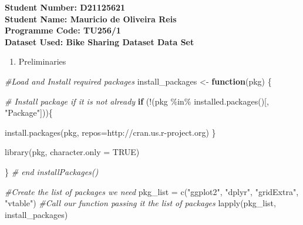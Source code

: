 \documentclass[
]{article}
\author{}
\date{\vspace{-2.5em}}
\newenvironment{Shaded}{\begin{snugshade}}{\end{snugshade}}
\newcommand{\AttributeTok}[1]{\textcolor[rgb]{0.77,0.63,0.00}{#1}}
\newcommand{\CommentTok}[1]{\textcolor[rgb]{0.56,0.35,0.01}{\textit{#1}}}
\newcommand{\ConstantTok}[1]{\textcolor[rgb]{0.00,0.00,0.00}{#1}}
\newcommand{\ControlFlowTok}[1]{\textcolor[rgb]{0.13,0.29,0.53}{\textbf{#1}}}
\newcommand{\FunctionTok}[1]{\textcolor[rgb]{0.00,0.00,0.00}{#1}}
\newcommand{\NormalTok}[1]{#1}
\newcommand{\OtherTok}[1]{\textcolor[rgb]{0.56,0.35,0.01}{#1}}
\newcommand{\SpecialCharTok}[1]{\textcolor[rgb]{0.00,0.00,0.00}{#1}}
\newcommand{\StringTok}[1]{\textcolor[rgb]{0.31,0.60,0.02}{#1}}
\providecommand{\tightlist}{%
  \setlength{\itemsep}{0pt}\setlength{\parskip}{0pt}}
\begin{document}
\textbf{Student Number: D21125621}\\
\textbf{Student Name: Mauricio de Oliveira Reis}\\
\textbf{Programme Code: TU256/1}\\
\textbf{Dataset Used: Bike Sharing Dataset Data Set}

\begin{enumerate}
\def\labelenumi{\arabic{enumi}.}
\setcounter{enumi}{-1}
\tightlist
\item
  Preliminaries
\end{enumerate}

\begin{Shaded}
\end{Shaded}

\begin{Shaded}
\begin{Highlighting}[]
\CommentTok{\#Load and Install required packages }
\NormalTok{install\_packages }\OtherTok{\textless{}{-}} \ControlFlowTok{function}\NormalTok{(pkg) \{ }
  
  \CommentTok{\# Install package if it is not already}
  \ControlFlowTok{if}\NormalTok{ (}\SpecialCharTok{!}\NormalTok{(pkg }\SpecialCharTok{\%in\%} \FunctionTok{installed.packages}\NormalTok{()[, }\StringTok{"Package"}\NormalTok{]))\{ }
    
    \FunctionTok{install.packages}\NormalTok{(pkg, }\AttributeTok{repos=}\StringTok{\textquotesingle{}http://cran.us.r{-}project.org\textquotesingle{}}\NormalTok{)}
\NormalTok{  \}}
  
  \FunctionTok{library}\NormalTok{(pkg, }\AttributeTok{character.only =} \ConstantTok{TRUE}\NormalTok{)}
  
\NormalTok{\} }\CommentTok{\# end installPackages()}

\CommentTok{\#Create the list of packages we need}
\NormalTok{pkg\_list }\OtherTok{=} \FunctionTok{c}\NormalTok{(}\StringTok{"ggplot2"}\NormalTok{, }\StringTok{"dplyr"}\NormalTok{, }\StringTok{"gridExtra"}\NormalTok{, }\StringTok{"vtable"}\NormalTok{)}
\CommentTok{\#Call our function passing it the list of packages}
\FunctionTok{lapply}\NormalTok{(pkg\_list, install\_packages)}
\end{Highlighting}
\end{Shaded}
\end{document}
